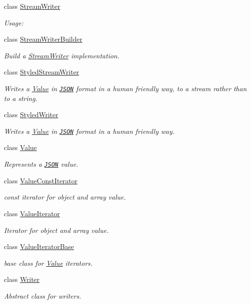 \begin{DoxyCompactItemize}
class \hyperlink{classJson_1_1StreamWriter}{Stream\+Writer}
\begin{DoxyCompactList}\small\item\em Usage\+: \end{DoxyCompactList}\item 
class \hyperlink{classJson_1_1StreamWriterBuilder}{Stream\+Writer\+Builder}
\begin{DoxyCompactList}\small\item\em Build a \hyperlink{classJson_1_1StreamWriter}{Stream\+Writer} implementation. \end{DoxyCompactList}\item 
class \hyperlink{classJson_1_1StyledStreamWriter}{Styled\+Stream\+Writer}
\begin{DoxyCompactList}\small\item\em Writes a \hyperlink{classJson_1_1Value}{Value} in \href{http://www.json.org}{\tt J\+S\+ON} format in a human friendly way, to a stream rather than to a string. \end{DoxyCompactList}\item 
class \hyperlink{classJson_1_1StyledWriter}{Styled\+Writer}
\begin{DoxyCompactList}\small\item\em Writes a \hyperlink{classJson_1_1Value}{Value} in \href{http://www.json.org}{\tt J\+S\+ON} format in a human friendly way. \end{DoxyCompactList}\item 
class \hyperlink{classJson_1_1Value}{Value}
\begin{DoxyCompactList}\small\item\em Represents a \href{http://www.json.org}{\tt J\+S\+ON} value. \end{DoxyCompactList}\item 
class \hyperlink{classJson_1_1ValueConstIterator}{Value\+Const\+Iterator}
\begin{DoxyCompactList}\small\item\em const iterator for object and array value. \end{DoxyCompactList}\item 
class \hyperlink{classJson_1_1ValueIterator}{Value\+Iterator}
\begin{DoxyCompactList}\small\item\em Iterator for object and array value. \end{DoxyCompactList}\item 
class \hyperlink{classJson_1_1ValueIteratorBase}{Value\+Iterator\+Base}
\begin{DoxyCompactList}\small\item\em base class for \hyperlink{classJson_1_1Value}{Value} iterators. \end{DoxyCompactList}\item 
class \hyperlink{classJson_1_1Writer}{Writer}
\begin{DoxyCompactList}\small\item\em Abstract class for writers. \end{DoxyCompactList}\end{DoxyCompactItemize}
